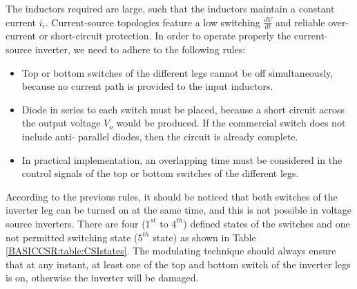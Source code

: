 The inductors required are large, such that the inductors
maintain a constant current $i_i$. Current-source topologies feature a low switching $\frac{dV}{dt}$ and reliable over-current or short-circuit protection. In order to operate properly the current-source inverter, we need to adhere to the following rules:
\begin{itemize}
\item Top or bottom switches of the different legs cannot be off simultaneously, because no current path is provided to the input inductors.
\item Diode in series to each switch must be placed, because a short circuit across the output voltage $V_o$ would be produced. If the commercial switch does not include anti- parallel diodes, then the circuit is already complete.
\item In practical implementation, an overlapping time must be considered in the control signals of the top or bottom switches of the different legs.
\end{itemize}

According to the previous rules, it should be noticed that both switches of the inverter leg can be turned on at the same time, and this is not possible in voltage source inverters. There are four ($1^{st}$ to $4^{th}$) defined states of the switches and one not permitted switching state ($5^{th}$ state) as shown in Table \ref{BASICCSR:table:CSIstates}. The modulating technique should always ensure that at any instant, at least one of the top and bottom switch of the inverter legs is on, otherwise the inverter will be damaged.

